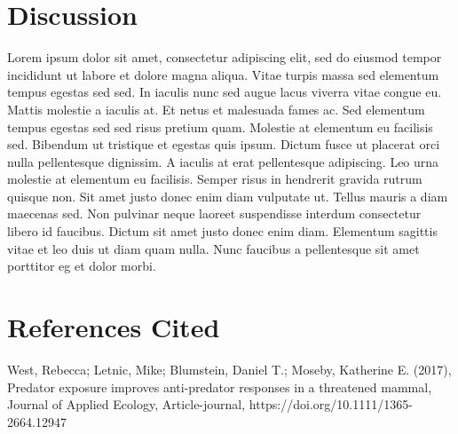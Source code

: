 \documentclass[letterpaper]{article}
\begin{document}
\section*{Discussion}
Lorem ipsum dolor sit amet, consectetur adipiscing elit, sed do eiusmod tempor incididunt ut labore et dolore magna aliqua. Vitae turpis massa sed elementum tempus egestas sed sed. In iaculis nunc sed augue lacus viverra vitae congue eu. Mattis molestie a iaculis at. Et netus et malesuada fames ac. Sed elementum tempus egestas sed sed risus pretium quam. Molestie at elementum eu facilisis sed. Bibendum ut tristique et egestas quis ipsum. Dictum fusce ut placerat orci nulla pellentesque dignissim. A iaculis at erat pellentesque adipiscing. Leo urna molestie at elementum eu facilisis. Semper risus in hendrerit gravida rutrum quisque non. Sit amet justo donec enim diam vulputate ut. Tellus mauris a diam maecenas sed. Non pulvinar neque laoreet suspendisse interdum consectetur libero id faucibus. Dictum sit amet justo donec enim diam. Elementum sagittis vitae et leo duis ut diam quam nulla. Nunc faucibus a pellentesque sit amet porttitor eg
et dolor morbi.

\section*{References Cited}
West, Rebecca; Letnic, Mike; Blumstein, Daniel T.; Moseby, Katherine E. (2017), Predator exposure improves anti-predator responses in a threatened mammal, Journal of Applied Ecology, Article-journal, https://doi.org/10.1111/1365-2664.12947
\end{document}
